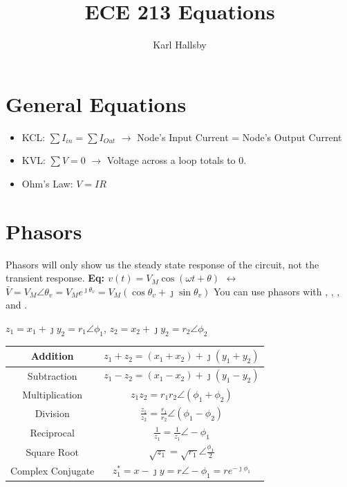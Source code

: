 \documentclass[10pt,letterpaper,final,twoside,notitlepage]{article}
\author{Karl Hallsby}
\title{ECE 213 Equations}
\begin{document}
\section*{General Equations}
	\begin{itemize}[noitemsep] %
		\item KCL: $\sum I_{in} = \sum I_{Out}$ $\rightarrow$ Node's Input Current = Node's Output Current
		\item KVL: $\sum V = 0$ $\rightarrow$ Voltage across a loop totals to 0.
		\item Ohm's Law: $V=IR$
	\end{itemize}
	\vspace{-5mm}

\section*{Phasors} \label{sec:Phasors}
Phasors will only show us the steady state response of the circuit, not the transient response. \newline 
\textbf{\large Eq: $v(t)=V_{M} \cos \left(\omega t + \theta \right)$ $\leftrightarrow$ $\bar{V}=V_{M} \angle \theta_{v} = V_{M}e^{\jmath \theta_{v}} = V_{M}\left(\cos \theta_{v} + \jmath \sin \theta_{v}\right)$} \newline
You can use phasors with , , , and . \newline
	\begin{table}[ht] %
		\centering
		\renewcommand{\arraystretch}{1.4}
		$z_1=x_1+\jmath y_2=r_1\angle\phi_1$, $z_2=x_2+\jmath y_2=r_2\angle\phi_2$
		\begin{tabular}{|c|c|} 
			\hline
			Addition & $z_1+z_2=\left( x_1+x_2 \right)+ \jmath \left( y_1+y_2 \right)$ \\ \hline
			Subtraction & $z_1-z_2=\left( x_1-x_2 \right)+ \jmath \left( y_1-y_2 \right)$ \\ \hline
			Multiplication & $z_{1}z_{2}=r_{1}r_{2}\angle \left( \phi_1 + \phi_2 \right)$ \\ \hline
			Division & $\frac{z_{1}}{z_{2}} = \frac{r_{1}}{r_{2}} \angle \left(\phi_1 - \phi_2 \right)$ \\ \hline
			Reciprocal & $\frac{1}{z_1}=\frac{1}{z_1} \angle -\phi_1$ \\ \hline
			Square Root & $\sqrt{z_1}=\sqrt{r_1} \angle \frac{\phi_1}{2}$ \\ \hline
			Complex Conjugate & $ z_1^*=x- \jmath y=r \angle -\phi_1=re^{-\jmath \phi_1}$\\ \hline
		\end{tabular}
	\end{table}
	\vspace{-8mm}
\end{document}
